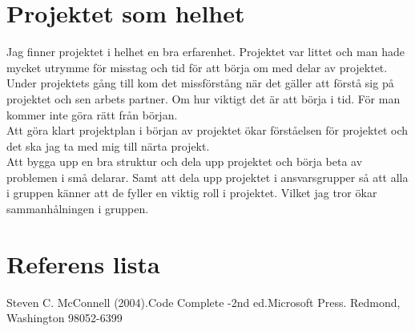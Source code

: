 \documentclass{TDP003mall}
\begin{document}
\section{Projektet som helhet}
Jag finner projektet i helhet en bra erfarenhet. Projektet var littet och man hade mycket utrymme för misstag och tid för att börja om med delar av projektet. Under projektets gång till kom det missförstång när det gäller att förstå sig på projektet och sen arbets partner. Om hur viktigt det är att börja i tid. För man kommer inte göra rätt från början.\\ 
Att göra klart projektplan i början av projektet ökar förståelsen för projektet och det ska jag ta med mig till närta projekt.\\
Att bygga upp en bra struktur och dela upp projektet och börja beta av problemen i små delarar. Samt att dela upp projektet i ansvarsgrupper så att alla i gruppen känner att de fyller en viktig roll i projektet. Vilket jag tror ökar sammanhålningen i gruppen. 
\section{Referens lista}
Steven C. McConnell (2004).Code Complete -2nd ed.Microsoft Press. Redmond, Washington 98052-6399
\end{document}
